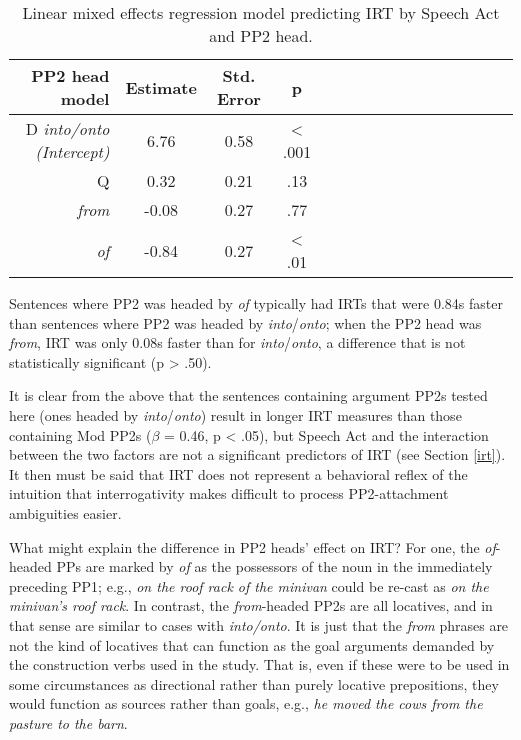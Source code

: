 \documentclass[11pt,oneside]{book}
\begin{document}
\begin{table}[!h]

\caption{\label{tab:pp2hd}Linear mixed effects regression model predicting IRT by Speech Act and PP2 head.}
\centering
\begin{tabular}{rcccrcccrcccrccc}
\toprule
PP2 head model & Estimate & Std. Error & p\\
\midrule
D \em{into/onto} (Intercept) & 6.76 & 0.58 & < .001\\
Q & 0.32 & 0.21 & .13\\
\em{from} & -0.08 & 0.27 & .77\\
\em{of} & -0.84 & 0.27 & < .01\\
\bottomrule
\end{tabular}
\end{table}

Sentences where PP2 was headed by \emph{of} typically had IRTs that were 0.84s faster than sentences where PP2 was headed by \emph{into}/\emph{onto}; when the PP2 head was \emph{from}, IRT was only 0.08s faster than for \emph{into}/\emph{onto}, a difference that is not statistically significant (p \textgreater{} .50).

It is clear from the above that the sentences containing argument PP2s tested here (ones headed by \emph{into}/\emph{onto}) result in longer IRT measures than those containing Mod PP2s (\(\beta\) = 0.46, p \textless{} .05), but Speech Act and the interaction between the two factors are not a significant predictors of IRT (see Section \ref{irt}). It then must be said that IRT does not represent a behavioral reflex of the intuition that interrogativity makes difficult to process PP2-attachment ambiguities easier.

What might explain the difference in PP2 heads' effect on IRT? For one, the \emph{of}-headed PPs are marked by \emph{of} as the possessors of the noun in the immediately preceding PP1; e.g., \emph{on the roof rack of the minivan} could be re-cast as \emph{on the minivan's roof rack}. In contrast, the \emph{from}-headed PP2s are all locatives, and in that sense are similar to cases with \emph{into/onto}. It is just that the \emph{from} phrases are not the kind of locatives that can function as the goal arguments demanded by the construction verbs used in the study. That is, even if these were to be used in some circumstances as directional rather than purely locative prepositions, they would function as sources rather than goals, e.g., \emph{he moved the cows from the pasture to the barn}.
\end{document}
